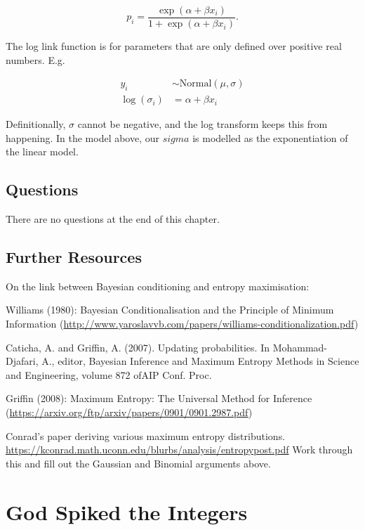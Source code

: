 \documentclass[
]{book}
\begin{document}
\[
p_i = \frac{\exp(\alpha + \beta x_i)}{1 + \exp(\alpha + \beta x_i)}.
\]

The log link function is for parameters that are only defined over positive real numbers. E.g.

\[
\begin{aligned}
y_i &\sim \text{Normal}(\mu,\sigma) \\
\log(\sigma_i) &= \alpha + \beta x_i
\end{aligned}
\]

Definitionally, \(\sigma\) cannot be negative, and the log transform keeps this from happening. In the model above, our \(sigma\) is modelled as the exponentiation of the linear model.

\hypertarget{questions-9}{%
\section{Questions}\label{questions-9}}

There are no questions at the end of this chapter.

\hypertarget{further-resources}{%
\section*{Further Resources}\label{further-resources}}

On the link between Bayesian conditioning and entropy maximisation:

Williams (1980): Bayesian Conditionalisation and the Principle of Minimum Information (\url{http://www.yaroslavvb.com/papers/williams-conditionalization.pdf})

Caticha, A. and Griffin, A. (2007). Updating probabilities. In Mohammad-Djafari, A., editor, Bayesian Inference and Maximum Entropy Methods in Science and Engineering, volume 872 ofAIP Conf. Proc.

Griffin (2008): Maximum Entropy: The Universal Method for Inference (\url{https://arxiv.org/ftp/arxiv/papers/0901/0901.2987.pdf})

Conrad's paper deriving various maximum entropy distributions. \url{https://kconrad.math.uconn.edu/blurbs/analysis/entropypost.pdf}
Work through this and fill out the Gaussian and Binomial arguments above.

\hypertarget{god_spiked}{%
\chapter{God Spiked the Integers}\label{god_spiked}}
\end{document}
